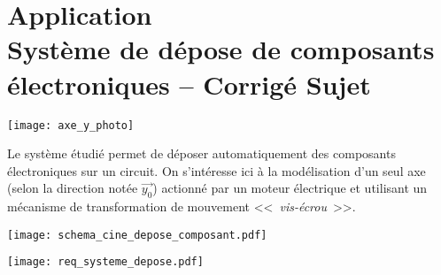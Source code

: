 \chapter*{Application  \\ 
Système de dépose de composants électroniques -- \ifprof Corrigé \else Sujet \fi}

\iflivret {} \else
\ifprof  {} \else \fi
\fi

\setcounter{question}{0}
\begin{marginfigure}
\centering
\texttt{[image: axe\_y\_photo]}
\end{marginfigure}

Le système étudié permet de déposer automatiquement des composants électroniques sur un circuit.
On s'intéresse ici à la modélisation d'un seul axe (selon la direction notée $\overrightarrow{y_0}$) actionné par un moteur électrique et utilisant un mécanisme de transformation de mouvement <<~\textit{vis-écrou}~>>.


\begin{marginfigure}
\texttt{[image: schema\_cine\_depose\_composant.pdf]}
\end{marginfigure}

\begin{marginfigure}
\texttt{[image: req\_systeme\_depose.pdf]}
\end{marginfigure}



